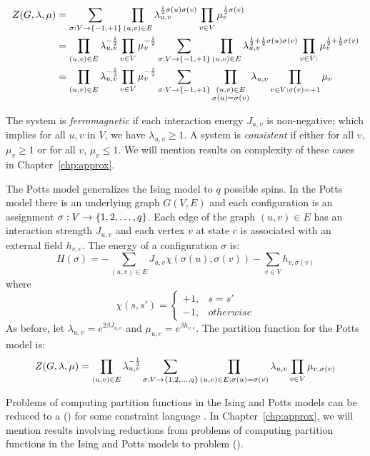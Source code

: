 \begin{align*}
Z(G,\lambda,\mu)&=\sum_{\sigma :V\to\{{-1,+1}\}} \prod_{(u,v)\in E} \lambda_{u,v}^{\frac{1}{2}
\sigma(u)\sigma(v)}\prod_{v\in V}\mu_v^{\frac{1}{2}\sigma(v)}\\
&=\prod_{(u,v)\in E}\lambda_{u,v}^{-\frac{1}{2}}\prod_{v\in V}\mu_v^{-\frac{1}{2}}\sum_{\sigma:V\to
\{{-1,+1}\}}
\prod_{(u,v)\in E}\lambda_{u,v}^{\frac{1}{2} + \frac{1}{2}\sigma(u)\sigma(v)}\prod_{v\in V:
}\mu_v^{\frac{1}{2} + \frac{1}{2}\sigma(v)} \\
&=\prod_{(u,v)\in E}\lambda_{u,v}^{-\frac{1}{2}}\prod_{v\in V}\mu_v^{-\frac{1}{2}}\sum_{\sigma:V\to
\{{-1,+1}\}}
\prod_{\substack{(u,v)\in E \\ \sigma(u)=\sigma(v)}}\lambda_{u,v}\prod_{v\in V:
\sigma(v)=+1}\mu_v
\end{align*}

The system is \emph{ferromagnetic} if each interaction energy \(J_{u,v}\) is non-negative; 
which implies for all \(u,v\) in \(V\), we have \(\lambda_{u,v} \ge 1\)\@.
A system is \emph{consistent} if
either for all \(v\), \(\mu_v\ge 1\) or for all \(v\), \(\mu_v \le 1\)\@. We will
mention results on complexity of these cases in Chapter~\ref{chp:approx}\@.

The Potts model generalizes the Ising model to \(q\) possible spins.
In the Potts model there is an underlying graph \(G(V,E)\) and 
each configuration is an assignment \(\sigma:V\to \{{{1,2,\dotsc,q}}\}\)\@.
Each edge of the graph \((u,v)\in E\) has an interaction
strength \(J_{u,v}\) and each vertex \(v\) at state \(c\) is associated with an
external field \(h_{v,c}\)\@. The energy of a configuration $\sigma$ is:
\[H(\sigma)=-\sum_{(u,v)\in E} J_{u,v}\chi(\sigma(u),\sigma(v)) - \sum_{v\in V} 
h_{v,\sigma(v)}\]
where
\[\chi(s,s')=\begin{cases}+1, & s=s'\\-1, & otherwise\end{cases}\]
As before, let \(\lambda_{u,v}=e^{2\beta J_{u,v}}\) and
\(\mu_{u,c}=e^{\beta h_{v,c}}\)\@. The partition function for the Potts model is:
\[Z(G,\lambda,\mu)=\prod_{(u,v)\in E}\lambda_{u,v}^{-\frac{1}{2}}
\sum_{\sigma:V\to\{{{1,2,\dotsc,q}}\}} \prod_{(u,v)\in E:\sigma(u)=\sigma(v)}\lambda_{u,v}
\prod_{v\in V}\mu_{v,\sigma(v)}\]

Problems of computing partition functions in the Ising and Potts models can be
reduced to a \ccsp(\mrelset) for some constraint language \mrelset\@.
In Chapter~\ref{chp:approx}, we will mention results involving reductions from problems
of computing partition functions in the Ising and Potts models to problem \ccsp(\mrelset)\@.

